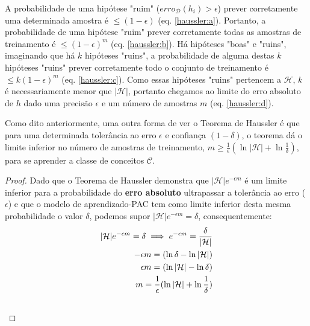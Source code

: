 \documentclass[
10pt, %
a4paper, %
onecolumn, %
]{article}
\begin{document}
A probabilidade de uma hipótese "ruim" ($erro_{\mathcal{D}}(h_i)>\epsilon$) prever corretamente uma determinada amostra é $\leq (1-\epsilon)$ (eq. \ref{haussler:a}). Portanto, a probabilidade de uma hipótese "ruim" prever corretamente todas as amostras de treinamento é  $\leq (1-\epsilon)^m$ (eq. \ref{haussler:b}). Há hipóteses "boas" e "ruins", imaginando que há $k$ hipóteses "ruins", a probabilidade de alguma destas $k$ hipóteses "ruins" prever corretamente todo o conjunto de treinamento é $\leq k (1-\epsilon)^m$ (eq. \ref{haussler:c}). Como essas hipóteses "ruins" pertencem a $\mathcal{H}$, $k$ é necessariamente menor que $|\mathcal{H}|$, portanto chegamos ao limite do erro absoluto de $h$ dado uma precisão $\epsilon$  e um número de amostras $m$ (eq. \ref{haussler:d}).

Como dito anteriormente, uma outra forma de ver o Teorema de Haussler é que para uma determinada tolerância ao erro $\epsilon$ e confiança $(1-\delta)$, o teorema dá o limite inferior no número de amostras de treinamento, $m \geq \frac{1}{\epsilon}(\ln{|\mathcal{H}|}+\ln{\frac{1}{\delta}})$,  para se aprender a classe de conceitos $\mathcal{C}$.

\bigskip

\noindent{}

\begin{proof}  Dado que o  Teorema de Haussler demonstra que $|\mathcal{H}|e^{-\epsilon m}$ é um limite inferior para a probabilidade do \textbf{erro absoluto} ultrapassar a tolerância ao erro ($\epsilon$) e que o modelo de aprendizado-PAC tem como limite inferior desta mesma probabilidade o valor $\delta$, podemos supor $|\mathcal{H}|e^{-\epsilon m}=\delta$, consequentemente:
\begin{align}
    |\mathcal{H}|e^{-\epsilon m}=\delta \implies e^{-\epsilon m} = \frac{\delta}{|\mathcal{H}|} \\
    - \epsilon m = (\ln{\delta} - \ln{|\mathcal{H}|})  \\
    \epsilon m = (\ln{|\mathcal{H}|} - \ln{\delta}) \\
    m = \frac{1}{\epsilon}(\ln{|\mathcal{H}|} + \ln{\frac{1}{\delta}}) \label{sample_complexity}\\
    \qedhere
\end{align}
\end{proof}
\end{document}
